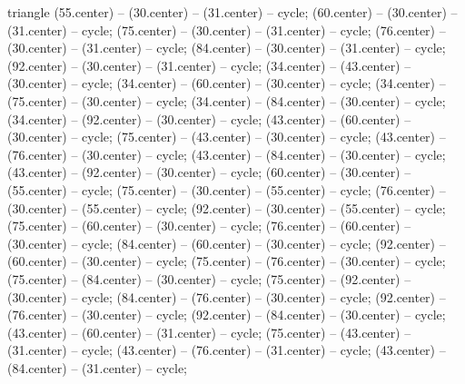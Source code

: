 {\begin{pgfonlayer}{triangle}
 (55.center) -- (30.center) -- (31.center) -- cycle; 
 (60.center) -- (30.center) -- (31.center) -- cycle; 
 (75.center) -- (30.center) -- (31.center) -- cycle; 
 (76.center) -- (30.center) -- (31.center) -- cycle; 
 (84.center) -- (30.center) -- (31.center) -- cycle; 
 (92.center) -- (30.center) -- (31.center) -- cycle; 
 (34.center) -- (43.center) -- (30.center) -- cycle; 
 (34.center) -- (60.center) -- (30.center) -- cycle; 
 (34.center) -- (75.center) -- (30.center) -- cycle; 
 (34.center) -- (84.center) -- (30.center) -- cycle; 
 (34.center) -- (92.center) -- (30.center) -- cycle; 
 (43.center) -- (60.center) -- (30.center) -- cycle; 
 (75.center) -- (43.center) -- (30.center) -- cycle; 
 (43.center) -- (76.center) -- (30.center) -- cycle; 
 (43.center) -- (84.center) -- (30.center) -- cycle; 
 (43.center) -- (92.center) -- (30.center) -- cycle; 
 (60.center) -- (30.center) -- (55.center) -- cycle; 
 (75.center) -- (30.center) -- (55.center) -- cycle; 
 (76.center) -- (30.center) -- (55.center) -- cycle; 
 (92.center) -- (30.center) -- (55.center) -- cycle; 
 (75.center) -- (60.center) -- (30.center) -- cycle; 
 (76.center) -- (60.center) -- (30.center) -- cycle; 
 (84.center) -- (60.center) -- (30.center) -- cycle; 
 (92.center) -- (60.center) -- (30.center) -- cycle; 
 (75.center) -- (76.center) -- (30.center) -- cycle; 
 (75.center) -- (84.center) -- (30.center) -- cycle; 
 (75.center) -- (92.center) -- (30.center) -- cycle; 
 (84.center) -- (76.center) -- (30.center) -- cycle; 
 (92.center) -- (76.center) -- (30.center) -- cycle; 
 (92.center) -- (84.center) -- (30.center) -- cycle; 
 (43.center) -- (60.center) -- (31.center) -- cycle; 
 (75.center) -- (43.center) -- (31.center) -- cycle; 
 (43.center) -- (76.center) -- (31.center) -- cycle; 
 (43.center) -- (84.center) -- (31.center) -- cycle; 

\end{pgfonlayer}}
